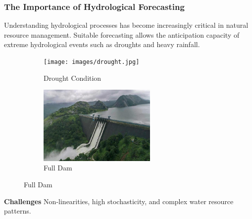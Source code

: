 \begin{frame}
	\frametitle{The Importance of Hydrological Forecasting}
	\begin{block}{}
	Understanding hydrological processes has become increasingly critical in natural resource management. Suitable forecasting allows the anticipation capacity of extreme hydrological events such as droughts and heavy rainfall.
	\end{block}
	\begin{figure}
		\centering
		\begin{subfigure}[b]{0.45\textwidth}
			\centering
			\texttt{[image: images/drought.jpg]}
			\caption{Drought Condition}
		\end{subfigure}
		\hfill
		\begin{subfigure}[b]{0.45\textwidth}
			\centering
			\includegraphics[width=\textwidth, height=3.8cm]{images/full_dam.jpg}
			\caption{Full Dam}
		\end{subfigure}
	\end{figure}
	
		\begin{block}{\textcolor{myNewColorB}{\textbf{Challenges}}}
		Non-linearities, high stochasticity, and complex water resource patterns.
		\end{block}
	
\end{frame}


